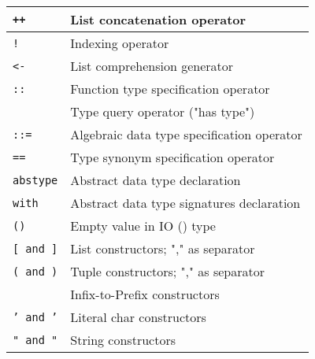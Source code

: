\documentclass[]{article}
\begin{document}
\begin{tabular}{ | l | l | }
	\texttt{++}						& List concatenation operator						\\ \hline
	\texttt{!}						& Indexing operator									\\ \hline
	\texttt{<-}						& List comprehension generator						\\ \hline
	\hline
	\texttt{::}						& Function type specification operator				\\ 
									& Type query operator ("has type")					\\ \hline
	\texttt{::=}					& Algebraic data type specification operator		\\ \hline
	\texttt{==}						& Type synonym specification operator				\\ \hline
	\texttt{abstype}				& Abstract data type declaration					\\ \hline
	\texttt{with}					& Abstract data type signatures declaration			\\ \hline
	\texttt{()}						& Empty value in IO () type							\\ \hline
	\hline
	\texttt{[ and ]}				& List constructors; "," as separator				\\ \hline
	\texttt{( and )}				& Tuple constructors; "," as separator				\\ 
									& Infix-to-Prefix constructors						\\ \hline
	\texttt{' and '}				& Literal char constructors							\\ \hline
	\texttt{" and "}				& String constructors								\\ \hline
\end{tabular}
\end{document}
